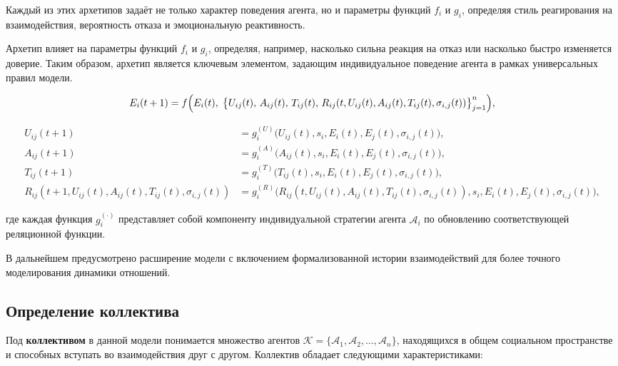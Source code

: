 \documentclass[12pt]{article}
\begin{document}
Каждый из этих архетипов задаёт не только характер поведения агента, но и параметры функций \( f_i \) и \( g_i \), определяя стиль реагирования на взаимодействия, вероятность отказа и эмоциональную реактивность.

Архетип влияет на параметры функций \( f_i \) и \( g_i \), определяя, например, насколько сильна реакция на отказ или насколько быстро изменяется доверие. Таким образом, архетип является ключевым элементом, задающим индивидуальное поведение агента в рамках универсальных правил модели.
\bigskip

%
\[
E_i(t+1) = f\Bigl(E_i(t),\; \bigl\{ U_{ij}(t),\, A_{ij}(t),\, T_{ij}(t),\, R_{ij}(t, U_{ij}(t), A_{ij}(t), T_{ij}(t), \sigma_{i,j}(t)) \bigr\}_{j=1}^n \Bigr),
\]

\[
\begin{aligned}
U_{ij}(t+1) &= g^{(U)}_i\big(U_{ij}(t), s_i, E_i(t), E_j(t), \sigma_{i,j}(t)\big), \\
A_{ij}(t+1) &= g^{(A)}_i\big(A_{ij}(t), s_i, E_i(t), E_j(t), \sigma_{i,j}(t)\big), \\
T_{ij}(t+1) &= g^{(T)}_i\big(T_{ij}(t), s_i, E_i(t), E_j(t), \sigma_{i,j}(t)\big), \\
R_{ij}(t+1, U_{ij}(t), A_{ij}(t), T_{ij}(t), \sigma_{i,j}(t)) &= g^{(R)}_i\big(R_{ij}(t, U_{ij}(t), A_{ij}(t), T_{ij}(t), \sigma_{i,j}(t)), s_i, E_i(t), E_j(t), \sigma_{i,j}(t)\big),
\end{aligned}
\]

где каждая функция \( g^{(\cdot)}_i \) представляет собой компоненту индивидуальной стратегии агента \( \mathcal{A}_i \) по обновлению соответствующей реляционной функции.

В дальнейшем предусмотрено расширение модели с включением формализованной истории взаимодействий для более точного моделирования динамики отношений.

\subsection*{Определение коллектива}

Под \textbf{коллективом} в данной модели понимается множество агентов \( \mathcal{K} = \{\mathcal{A}_1, \mathcal{A}_2, \ldots, \mathcal{A}_n \} \), находящихся в общем социальном пространстве и способных вступать во взаимодействия друг с другом. Коллектив обладает следующими характеристиками:
\end{document}

